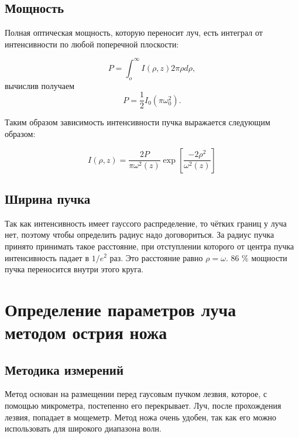 \documentclass[a4paper,14pt]{extarticle}
\begin{document}
\subsection{Мощность}
Полная оптическая мощность, которую переносит луч, есть интеграл от интенсивности по любой поперечной плоскости: 

\begin{equation}
	P = \int_{o}^{\infty} I(\rho, z) 2 \pi \rho d\rho,
	\label{P}
\end{equation}	
вычислив получаем 
\begin{equation}
	P = \frac{1}{2} I_0 (\pi \omega_0^2).
\end{equation}

Таким образом зависимость интенсивности пучка выражается следующим образом: 

\begin{equation}
	\boxed{ I(\rho, z) = \frac{2P}{\pi \omega^2(z)} \exp \left[ \frac{-2 \rho^2}{\omega^2(z)} \right]}
	\label{IP}
\end{equation}

\subsection{Ширина пучка}

Так как интенсивность имеет гауссого распределение, то чётких границ у луча нет, поэтому чтобы определить радиус надо договориться. За радиус пучка принято принимать такое расстояние, при отступлении которого от центра пучка интенсивность падает в $1/e^2$ раз. Это расстояние равно $\rho = \omega$. 86 $\%$ мощности пучка переносится внутри этого круга. 

\section{Определение параметров луча методом острия ножа} 

\subsection{Методика измерений}

Метод основан на размещении перед гаусовым пучком лезвия, которое, с помощью микрометра, постепенно его перекрывает. Луч, после прохождения лезвия, попадает в мощеметр. Метод ножа очень удобен, так как его можно использовать для широкого диапазона волн.  
\end{document}
